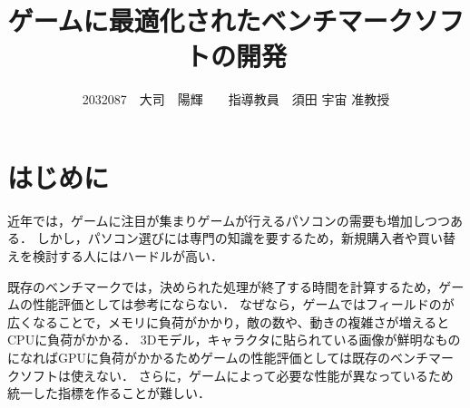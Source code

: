 \documentclass[twocolumn,10pt,a4j]{ltjsarticle}
\title{ゲームに最適化されたベンチマークソフトの開発}
\author{2032087　大司　陽輝　　指導教員　須田 宇宙 准教授}
\date{}
\begin{document}
\maketitle

\section{はじめに}


近年では，ゲームに注目が集まりゲームが行えるパソコンの需要も増加しつつある．
しかし，パソコン選びには専門の知識を要するため，新規購入者や買い替えを検討する人にはハードルが高い．




既存のベンチマークでは，決められた処理が終了する時間を計算するため，ゲームの性能評価としては参考にならない．
なぜなら，ゲームではフィールドのが広くなることで，メモリに負荷がかかり，敵の数や、動きの複雑さが増えるとCPUに負荷がかかる．
3Dモデル，キャラクタに貼られている画像が鮮明なものになればGPUに負荷がかかるためゲームの性能評価としては既存のベンチマークソフトは使えない．
さらに，ゲームによって必要な性能が異なっているため統一した指標を作ることが難しい．

\end{document}
